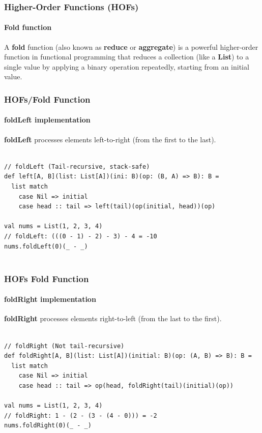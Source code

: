 \documentclass{beamer}
\begin{document}
\begin{frame}[fragile]
\frametitle{Higher-Order Functions (HOFs)}
\framesubtitle{Fold function}

A \textbf{fold} function (also known as \textbf{reduce} or \textbf{aggregate}) is a powerful higher-order function in functional programming that reduces a collection (like a \textbf{List}) to a single value by applying a binary operation repeatedly, starting from an initial value.

\end{frame}


\begin{frame}[fragile]
\frametitle{HOFs/Fold  Function}
\framesubtitle{foldLeft implementation}

\textbf{foldLeft} processes elements left-to-right (from the first to the last).

\begin{lstlisting}[style=scalaStyle]

// foldLeft (Tail-recursive, stack-safe)
def left[A, B](list: List[A])(ini: B)(op: (B, A) => B): B =
  list match
    case Nil => initial
    case head :: tail => left(tail)(op(initial, head))(op)

val nums = List(1, 2, 3, 4)
// foldLeft: (((0 - 1) - 2) - 3) - 4 = -10
nums.foldLeft(0)(_ - _)  


\end{lstlisting}

\end{frame}

\begin{frame}[fragile]
\frametitle{HOFs Fold Function}
\framesubtitle{foldRight implementation}

\textbf{foldRight} processes elements right-to-left (from the last to the first).

\begin{lstlisting}[style=scalaStyle]

// foldRight (Not tail-recursive)
def foldRight[A, B](list: List[A])(initial: B)(op: (A, B) => B): B =
  list match
    case Nil => initial
    case head :: tail => op(head, foldRight(tail)(initial)(op))

val nums = List(1, 2, 3, 4)
// foldRight: 1 - (2 - (3 - (4 - 0))) = -2
nums.foldRight(0)(_ - _)  

\end{lstlisting}

\end{frame}
\end{document}
